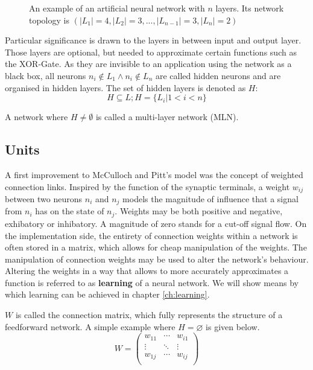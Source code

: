\documentclass[10pt,a4paper,DIV=11]{scrreprt}
\let\oldemptyset\emptyset
\let\emptyset\varnothing
\begin{document}
\begin{figure}[H]
\caption{An example of an artificial neural network with $n$ layers. Its network topology is $(|L_1|=4,|L_2|=3,...,|L_{n-1}|=3,|L_n|=2)$}
\label{fig:layer}
\end{figure}

Particular significance is drawn to the layers in between input and output layer. Those layers are optional, but needed to approximate certain 
functions such as the XOR-Gate.\cite{XOR} As they are invisible to an application using the network as a black box, all neurons $n_i \notin L_1 \wedge n_i \notin L_n$
are called hidden neurons and are organised in hidden layers. The set of hidden layers is denoted as $H$: 
\begin{equation}
H \subseteq L; H = \{L_i|1<i<n\}
\end{equation} 

A network where $H \neq \oldemptyset$ is called a multi-layer network (MLN). 

\subsection{Units}
\label{subsec:units}

A first improvement to McCulloch and Pitt's model was the concept of weighted connection links. Inspired by the function of the synaptic 
terminals, a weight $w_{ij}$ between two neurons $n_i$ and $n_j$ models the magnitude of influence that a signal from $n_i$ has on the state of $n_j$.
Weights may be both positive and negative, exhibatory or inhibatory. A magnitude of zero stands for a cut-off signal flow. 
On the implementation side, the entirety of connection weights within a network is often stored in a matrix, which allows for cheap manipulation of the weights. 
The manipulation of connection weights may be used to alter the network's behaviour. Altering the weights in a way that allows to more accurately approximates
a function is referred to as \textbf{learning} of a neural network. We will show means by which learning can be achieved in chapter \ref{ch:learning}.

$W$ is called the connection matrix, which fully represents the structure of a feedforward network. A simple example where $H = \emptyset$ is given below. 
\begin{equation}
W = 
\begin{pmatrix}
w_{11} & \cdots & w_{i1} \\
\vdots & \ddots & \vdots \\
w_{1j} & \cdots & w_{ij} \\
\end{pmatrix}
\end{equation}
\end{document}
